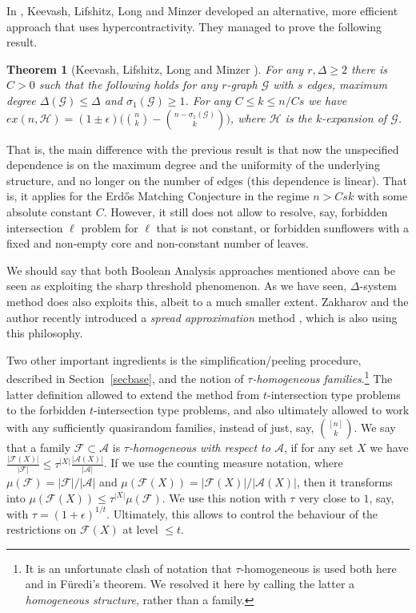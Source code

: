 \documentclass[graybox]{svmult}
\renewcommand{\le}{\leqslant}
\renewcommand{\ge}{\geqslant}
\newcommand{\ff}{\mathcal{F}}
\newcommand{\aaa}{\mathcal{A}}
\newcommand{\m}{\mathcal}
\newtheorem{thm}{Theorem}
\begin{document}
In \cite{KLLM}, Keevash, Lifshitz, Long and Minzer developed an alternative, more efficient approach that uses hypercontractivity. They managed to prove the following result.

\begin{thm}[Keevash, Lifshitz, Long and Minzer \cite{KLLM}]
For any $r, \Delta\ge 2$ there is $C>0$ such that the following holds for any $r$-graph $\m G$ with $s$ edges, maximum degree $\Delta(\m G)\le \Delta$ and $\sigma_1(\m G)\ge 1$. For any $C\le k\le n/Cs$ we have $ex(n, \m H) = (1\pm \epsilon)\Big({n\choose k}-{n-\sigma_1(\m G)\choose k}\Big)$, where $\m H$ is the $k$-expansion of $\m G$.
\end{thm}
That is, the main difference with the previous result is that now the unspecified dependence is on the maximum degree and the uniformity of the underlying structure, and no longer on the number of edges (this dependence is linear). That is, it applies for the Erd\H os Matching Conjecture in the regime $n>Csk$ with some absolute constant $C$. However, it still does not allow to resolve, say, forbidden intersection $\ell$ problem for $\ell$ that is not constant, or forbidden sunflowers with a fixed and non-empty core and non-constant number of leaves.


We should say that both Boolean Analysis approaches mentioned above can be seen as exploiting the sharp threshold phenomenon. As we have seen, $\Delta$-system method does also exploits this, albeit to a much smaller extent. Zakharov and the author recently introduced a {\it spread approximation} method \cite{KuZa}, which is also using this philosophy.


Two other important ingredients is the simplification/peeling procedure, described in Section~\ref{secbase}, and the notion of {\it $\tau$-homogeneous families}.\footnote{It is an unfortunate clash of notation that $\tau$-homogeneous is used both here and in F\"uredi's theorem. We resolved it here by calling the latter a {\it homogeneous structure}, rather than a family.} The latter definition allowed to extend the method from $t$-intersection type problems to the forbidden $t$-intersection type problems, and also ultimately allowed to work with any sufficiently quasirandom families, instead of just, say, ${[n]\choose k}$. We say that a family $\ff\subset \m A$ is {\it $\tau$-homogeneous with respect to $\m A$}, if for any set $X$ we have $\frac {|\ff(X)|}{|\ff|}\le \tau^{|X|}\frac {|\aaa(X)|}{|\aaa|}$. If we use the counting measure notation, where $\mu(\ff) = |\ff|/|\aaa|$ and $\mu(\ff(X)) = |\ff(X)|/|\aaa(X)|$, then it transforms into $\mu(\ff(X))\le \tau^{|X|}\mu(\ff)$. We use this notion with $\tau$ very close to $1$, say, with $\tau = (1+\epsilon)^{1/t}$. Ultimately, this allows to control the behaviour of the restrictions on $\ff(X)$ at level $\le t$.
\end{document}
